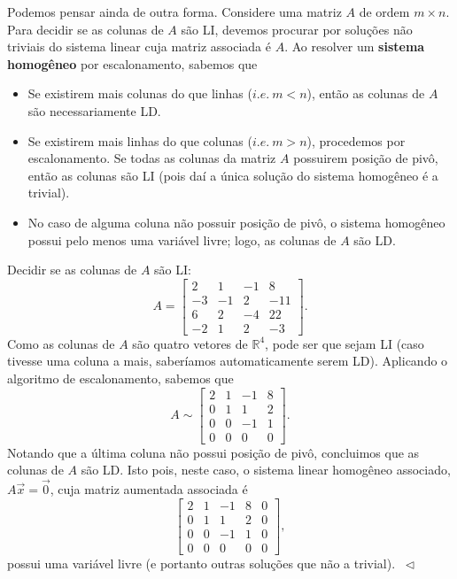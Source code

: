 \documentclass[../livro.tex]{subfiles}
\begin{document}
Podemos pensar ainda de outra forma. Considere uma matriz $A$ de ordem $m\times n.$ Para decidir se as colunas de $A$ são LI, devemos procurar por soluções não triviais do sistema linear cuja matriz associada é $A$. Ao resolver um \textbf{sistema homogêneo} por escalonamento, sabemos que
\begin{itemize}
  \item Se existirem mais colunas do que linhas ($i.e. \ m<n$), então as colunas de $A$ são necessariamente LD.
  \item Se existirem mais linhas do que colunas ($i.e. \ m>n$), procedemos por escalonamento. Se todas as colunas da matriz $A$ possuirem posição de pivô, então as colunas são LI (pois daí a única solução do sistema homogêneo é a trivial). 
  \item No caso de alguma coluna não possuir posição de pivô, o sistema homogêneo possui pelo menos uma variável livre; logo, as colunas de $A$ são LD.
\end{itemize}

\begin{example}
Decidir se as colunas de $A$ são LI:
\begin{equation}
A = \left[
\begin{array}{rrrr}
   2&1&-1&8\\
   -3&-1&2&-11\\
   6&2&-4&22\\
   -2&1&2&-3
\end{array}
\right].
\end{equation} Como as colunas de $A$ são quatro vetores de $\mathbb{R}^4$, pode ser que sejam LI (caso tivesse uma coluna a mais, saberíamos automaticamente serem LD). Aplicando o algoritmo de escalonamento, sabemos que
\begin{equation}
A \sim \left[
\begin{array}{cccc}
   2&1&-1&8\\
   0&1&1&2\\
   0&0&-1&1\\
   0&0&0&0
\end{array}
\right].
\end{equation} Notando que a última coluna não possui posição de pivô, concluimos que as colunas de $A$ são LD. Isto pois, neste caso, o sistema linear homogêneo associado, $A \vec{x} = \vec{0}$, cuja matriz aumentada associada é
\begin{equation}
\left[
\begin{array}{cccc|c}
   2&1&-1&8&0\\
   0&1&1&2& 0\\
   0&0&-1&1&0\\
   0&0&0&0&0
\end{array}
\right],
\end{equation} possui uma variável livre (e portanto outras soluções que não a trivial). $\ \lhd$
\end{example}
\end{document}
